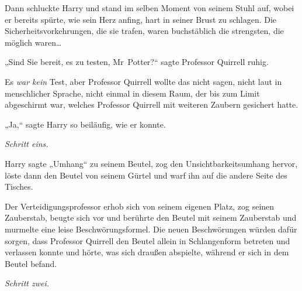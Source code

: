 Dann schluckte Harry und stand im selben Moment von seinem Stuhl auf, wobei er bereits spürte, wie sein Herz anfing, hart in seiner Brust zu schlagen. Die Sicherheitsvorkehrungen, die sie trafen, waren buchstäblich die strengsten, die möglich waren…

„Sind Sie bereit, es zu testen, Mr~Potter?“ sagte Professor Quirrell ruhig.

Es \emph{war kein} Test, aber Professor Quirrell wollte das nicht sagen, nicht laut in menschlicher Sprache, nicht einmal in diesem Raum, der bis zum Limit abgeschirmt war, welches Professor Quirrell mit weiteren Zaubern gesichert hatte.

„Ja,“ sagte Harry so beiläufig, wie er konnte.

\emph{Schritt eins.}

Harry sagte „Umhang“ zu seinem Beutel, zog den Unsichtbarkeitsumhang hervor, löste dann den Beutel von seinem Gürtel und warf ihn auf die andere Seite des Tisches.

Der Verteidigungsprofessor erhob sich von seinem eigenen Platz, zog seinen Zauberstab, beugte sich vor und berührte den Beutel mit seinem Zauberstab und murmelte eine leise Beschwörungsformel. Die neuen Beschwörungen würden dafür sorgen, dass Professor Quirrell den Beutel allein in Schlangenform betreten und verlassen konnte und hörte, was sich draußen abspielte, während er sich in dem Beutel befand.

\emph{Schritt zwei.}

